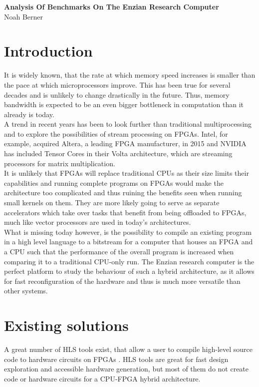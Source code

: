 \documentclass[12pt]{article}
\begin{document}
\begingroup  
  \centering
  \LARGE \textbf{Analysis Of Benchmarks On The Enzian Research Computer}\\
  \large Noah Berner\par
\endgroup

\section*{Introduction}
It is widely known, that the rate at which memory speed increases is smaller than the pace at which microprocessors improve. This has been true for several decades and is unlikely to change drastically in the future. Thus, memory bandwidth is expected to be an even bigger bottleneck in computation than it already is today.\\
A trend in recent years has been to look further than traditional multiprocessing and to explore the possibilities of stream processing on FPGAs. Intel, for example, acquired Altera, a leading FPGA manufacturer, in 2015 and NVIDIA has included Tensor Cores in their Volta architecture, which are streaming processors for matrix multiplication.\\
It is unlikely that FPGAs will replace traditional CPUs as their size limits their capabilities and running complete programs on FPGAs would make the architecture too complicated and thus ruining the benefits seen when running small kernels on them. They are more likely going to serve as separate accelerators which take over tasks that benefit from being offloaded to FPGAs, much like vector processors are used in today's architectures.\\
What is missing today however, is the possibility to compile an existing program in a high level language to a bitstream for a computer that houses an FPGA and a CPU such that the performance of the overall program is increased when comparing it to a traditional CPU-only run. The Enzian research computer \cite{Enzian} is the perfect platform to study the behaviour of such a hybrid architecture, as it allows for fast reconfiguration of the hardware and thus is much more versatile than other systems. 
\section*{Existing solutions}
A great number of HLS tools exist, that allow a user to compile high-level source code to hardware circuits on FPGAs \cite{HLS_overview}. HLS tools are great for fast design exploration and accessible hardware generation, but most of them do not create code or hardware circuits for a CPU-FPGA hybrid architecture.
\end{document}
